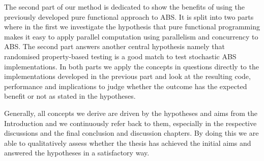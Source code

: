 
The second part of our method is dedicated to show the benefits of using the previously developed pure functional approach to ABS. It is split into two parts where in the first we investigate the hypothesis that pure functional programming makes it easy to apply parallel computation using parallelism and concurrency to ABS. The second part answers another central hypothesis namely that randomised property-based testing is a good match to test stochastic ABS implementations. In both parts we apply the concepts in questions directly to the implementations developed in the previous part and look at the resulting code, performance and implications to judge whether the outcome has the expected benefit or not as stated in the hypotheses.

Generally, all concepts we derive are driven by the hypotheses and aims from the Introduction and we continuously refer back to them, especially in the respective discussions and the final conclusion and discussion chapters. By doing this we are able to qualitatively assess whether the thesis has achieved the initial aims and answered the hypotheses in a satisfactory way.